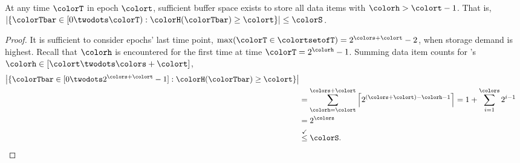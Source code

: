 \begin{lemma} \label{thm:steady-hv-geq-epoch}

At any time $\colorT$ in epoch $\colort$, sufficient buffer space exists to store all data items with \hv{} $\colorh > \colort - 1$.
That is, $\left| \{\colorTbar \in [0 \twodots \colorT) : \colorH(\colorTbar) \geq \colort \} \right| \leq \colorS$.
\end{lemma}

\begin{proof}
It is sufficient to consider epochs' last time point, $\max(\colorT \in \colortsetofT) = 2^{\colors + \colort} - 2$, when storage demand is highest.
Recall that \hv{} $\colorh$ is encountered for the first time at time $\colorT = 2^{\colorh} - 1$.
Summing data item counts for \hv{}'s $\colorh \in [\colort \twodots \colors + \colort]$,
\begin{align*}
\left| \{\colorTbar \in [0 \twodots 2^{\colors + \colort} - 1] : \colorH(\colorTbar) \geq \colort \} \right|\\
&= \sum_{\colorh=\colort}^{\colors + \colort} \left\lceil2^{(\colors + \colort) - \colorh - 1}\right\rceil
= 1 + \sum_{i=1}^{\colors} 2^{i - 1} \\
&= 2^{\colors}\\
&\stackrel{\checkmark}{\leq} \colorS.
\end{align*}
\end{proof}
